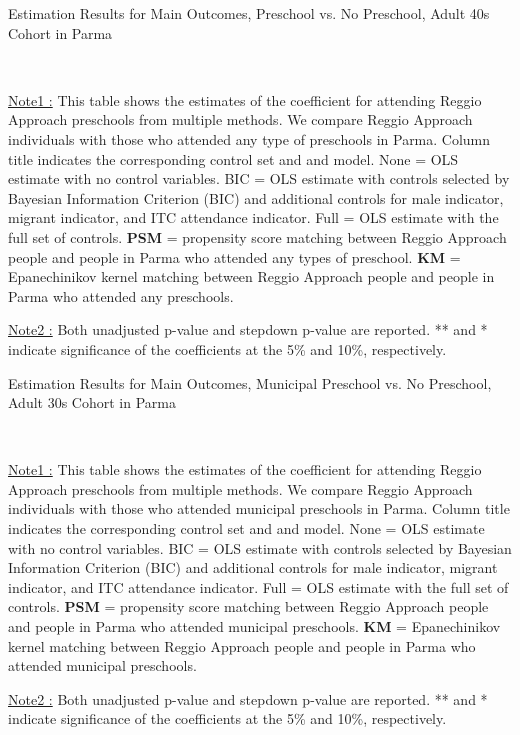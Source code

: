 \begin{table}[H] \caption{Estimation Results for Main Outcomes, Preschool vs. No Preschool, Adult 40s Cohort in Parma} \label{ols-M-adult40-reg-pres-parma}
\scalebox{0.62}{}
\vspace{1ex} \\
\footnotesize\raggedright{\underline{Note1 :} This table shows the estimates of the coefficient for attending Reggio Approach preschools from multiple methods. We compare Reggio Approach individuals with those who attended any type of preschools in Parma. Column title indicates the corresponding control set and and model. None = OLS estimate with no control variables. BIC = OLS estimate with controls selected by Bayesian Information Criterion (BIC) and additional controls for male indicator, migrant indicator, and ITC attendance indicator. Full = OLS estimate with the full set of controls. \textbf{PSM} =  propensity score matching between Reggio Approach people and people in Parma who attended any types of preschool. \textbf{KM} = Epanechinikov kernel matching between Reggio Approach people and people in Parma who attended any preschools.}

\footnotesize\raggedright{\underline{Note2 :} Both unadjusted p-value and stepdown p-value are reported. ** and * indicate significance of the coefficients at the 5\% and 10\%, respectively.}

\end{table}




\begin{table}[H] \caption{Estimation Results for Main Outcomes, Municipal Preschool vs. No Preschool, Adult 30s Cohort in Parma} \label{ols-M-adult30-reg-muni-parma}
\scalebox{0.62}{}
\vspace{1ex} \\
\footnotesize\raggedright{\underline{Note1 :} This table shows the estimates of the coefficient for attending Reggio Approach preschools from multiple methods. We compare Reggio Approach individuals with those who attended municipal preschools in Parma. Column title indicates the corresponding control set and and model. None = OLS estimate with no control variables. BIC = OLS estimate with controls selected by Bayesian Information Criterion (BIC) and additional controls for male indicator, migrant indicator, and ITC attendance indicator. Full = OLS estimate with the full set of controls. \textbf{PSM} =  propensity score matching between Reggio Approach people and people in Parma who attended municipal preschools. \textbf{KM} = Epanechinikov kernel matching between Reggio Approach people and people in Parma who attended municipal preschools.}

\footnotesize\raggedright{\underline{Note2 :} Both unadjusted p-value and stepdown p-value are reported. ** and * indicate significance of the coefficients at the 5\% and 10\%, respectively.}
\end{table}






